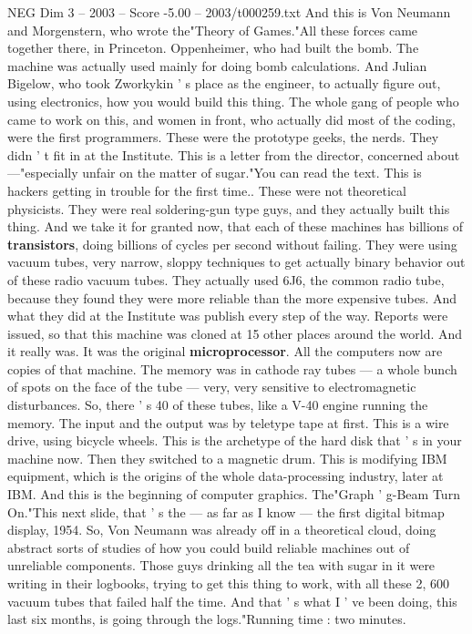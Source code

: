 \begin{textsample}{NEG Dim 3 – 2003 – Score -5.00 – 2003/t000259.txt}
And this is Von Neumann and Morgenstern, who wrote the"Theory of Games."All these forces came together there, in Princeton.
Oppenheimer, who had built the bomb.
The machine was actually used mainly for doing bomb calculations.
And Julian Bigelow, who took Zworkykin ' s place as the engineer, to actually figure out, using electronics, how you would build this thing.
The whole gang of people who came to work on this, and women in front, who actually did most of the coding, were the first programmers.
These were the prototype geeks, the nerds.
They didn ' t fit in at the Institute.
This is a letter from the director, concerned about —"especially unfair on the matter of sugar."You can read the text.
This is hackers getting in trouble for the first time..
These were not theoretical physicists.
They were real soldering-gun type guys, and they actually built this thing.
And we take it for granted now, that each of these machines has billions of \textbf{transistors}, doing billions of cycles per second without failing.
They were using vacuum tubes, very narrow, sloppy techniques to get actually binary behavior out of these radio vacuum tubes.
They actually used 6J6, the common radio tube, because they found they were more reliable than the more expensive tubes.
And what they did at the Institute was publish every step of the way.
Reports were issued, so that this machine was cloned at 15 other places around the world.
And it really was.
It was the original \textbf{microprocessor}.
All the computers now are copies of that machine.
The memory was in cathode ray tubes — a whole bunch of spots on the face of the tube — very, very sensitive to electromagnetic disturbances.
So, there ' s 40 of these tubes, like a V-40 engine running the memory.
The input and the output was by teletype tape at first.
This is a wire drive, using bicycle wheels.
This is the archetype of the hard disk that ' s in your machine now.
Then they switched to a magnetic drum.
This is modifying IBM equipment, which is the origins of the whole data-processing industry, later at IBM.
And this is the beginning of computer graphics.
The"Graph ' g-Beam Turn On."This next slide, that ' s the — as far as I know — the first digital bitmap display, 1954.
So, Von Neumann was already off in a theoretical cloud, doing abstract sorts of studies of how you could build reliable machines out of unreliable components.
Those guys drinking all the tea with sugar in it were writing in their logbooks, trying to get this thing to work, with all these 2, 600 vacuum tubes that failed half the time.
And that ' s what I ' ve been doing, this last six months, is going through the logs."Running time : two minutes.

\end{textsample}
